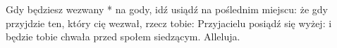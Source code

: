 Gdy będziesz wezwany * na gody, idź usiądź na poślednim miejscu: że gdy przyjdzie ten, który cię wezwał, rzecz tobie: Przyjacielu posiądź się wyżej: i będzie tobie chwała przed społem siedzącym. Alleluja.